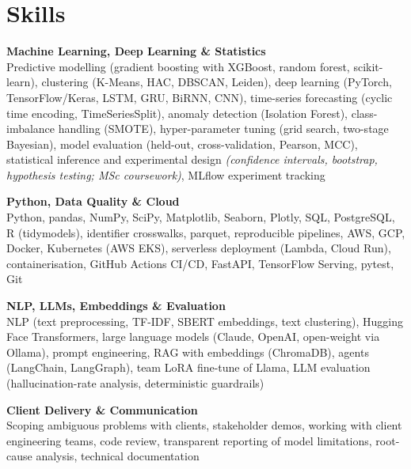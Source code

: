 \documentclass[a4paper,11pt]{article}
\newcommand{\skillgroup}[2]{{\color{headernavy}\textbf{#1}}\\ #2\par\vspace{3pt}}
\begin{document}
\section{Skills}
\skillgroup{Machine Learning, Deep Learning \& Statistics}{Predictive modelling (gradient boosting with XGBoost, random forest, scikit-learn), clustering (K-Means, HAC, DBSCAN, Leiden), deep learning (PyTorch, TensorFlow/Keras, LSTM, GRU, BiRNN, CNN), time-series forecasting (cyclic time encoding, TimeSeriesSplit), anomaly detection (Isolation Forest), class-imbalance handling (SMOTE), hyper-parameter tuning (grid search, two-stage Bayesian), model evaluation (held-out, cross-validation, Pearson, MCC), statistical inference and experimental design \textit{(confidence intervals, bootstrap, hypothesis testing; MSc coursework)}, MLflow experiment tracking}
\skillgroup{Python, Data Quality \& Cloud}{Python, pandas, NumPy, SciPy, Matplotlib, Seaborn, Plotly, SQL, PostgreSQL, R (tidymodels), identifier crosswalks, parquet, reproducible pipelines, AWS, GCP, Docker, Kubernetes (AWS EKS), serverless deployment (Lambda, Cloud Run), containerisation, GitHub Actions CI/CD, FastAPI, TensorFlow Serving, pytest, Git}
\skillgroup{NLP, LLMs, Embeddings \& Evaluation}{NLP (text preprocessing, TF-IDF, SBERT embeddings, text clustering), Hugging Face Transformers, large language models (Claude, OpenAI, open-weight via Ollama), prompt engineering, RAG with embeddings (ChromaDB), agents (LangChain, LangGraph), team LoRA fine-tune of Llama, LLM evaluation (hallucination-rate analysis, deterministic guardrails)}
\skillgroup{Client Delivery \& Communication}{Scoping ambiguous problems with clients, stakeholder demos, working with client engineering teams, code review, transparent reporting of model limitations, root-cause analysis, technical documentation}
\end{document}
